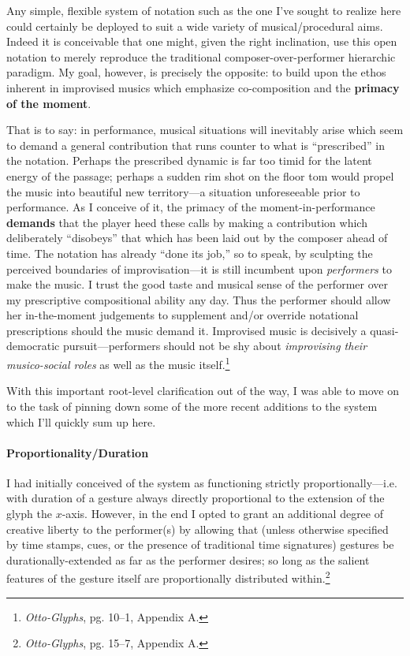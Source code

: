     \begin{smallquote}
        Any simple, flexible system of notation such as the one I've sought to realize here could certainly be deployed to suit a wide variety of musical/procedural aims. Indeed it is conceivable that one might, given the right inclination, use this open notation to merely reproduce the traditional composer-over-performer hierarchic paradigm. My goal, however, is precisely the opposite: to build upon the ethos inherent in improvised musics which emphasize co-composition and the \textbf{primacy of the moment}.

        That is to say: in performance, musical situations will inevitably arise which seem to demand a general contribution that runs counter to what is ``prescribed'' in the notation. Perhaps the prescribed dynamic is far too timid for the latent energy of the passage; perhaps a sudden rim shot on the floor tom would propel the music into beautiful new territory---a situation unforeseeable prior to performance. As I conceive of it, the primacy of the moment-in-performance \textbf{demands} that the player heed these calls by making a contribution which deliberately ``disobeys'' that which has been laid out by the composer ahead of time. The notation has already ``done its job,'' so to speak, by sculpting the perceived boundaries of improvisation---it is still incumbent upon \textit{performers} to make the music. I trust the good taste and musical sense of the performer over my prescriptive compositional ability any day. Thus the performer should allow her in-the-moment judgements to supplement and/or override notational prescriptions should the music demand it. Improvised music is decisively a quasi-democratic pursuit---performers should not be shy about \textit{improvising their musico-social roles} as well as the music itself.\footnote{\textit{Otto-Glyphs}, pg. 10--1, Appendix A.} 
    \end{smallquote}

    With this important root-level clarification out of the way, I was able to move on to the task of pinning down some of the more recent additions to the system which I'll quickly sum up here. 

    \paragraph{Proportionality/Duration} I had initially conceived of the system as functioning strictly proportionally---i.e. with duration of a gesture always directly proportional to the extension of the glyph the $x$-axis. However, in the end I opted to grant an additional degree of creative liberty to the performer(s) by allowing that (unless otherwise specified by time stamps, cues, or the presence of traditional time signatures) gestures be durationally-extended as far as the performer desires; so long as the salient features of the gesture itself are proportionally distributed within.\footnote{\textit{Otto-Glyphs}, pg. 15--7, Appendix A.}

